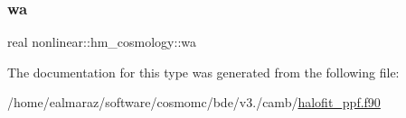 \mbox{\label{structnonlinear_1_1hm__cosmology_a473b949bacf7fd7c8d3d6c5247dd0164}} 
\subsubsection{\texorpdfstring{wa}{wa}}
{\footnotesize\ttfamily real nonlinear\+::hm\+\_\+cosmology\+::wa\hspace{0.3cm}{\ttfamily [private]}}



The documentation for this type was generated from the following file\+:\begin{DoxyCompactItemize}
\item 
/home/ealmaraz/software/cosmomc/bde/v3./camb/\mbox{\hyperlink{halofit__ppf_8f90}{halofit\+\_\+ppf.\+f90}}\end{DoxyCompactItemize}
